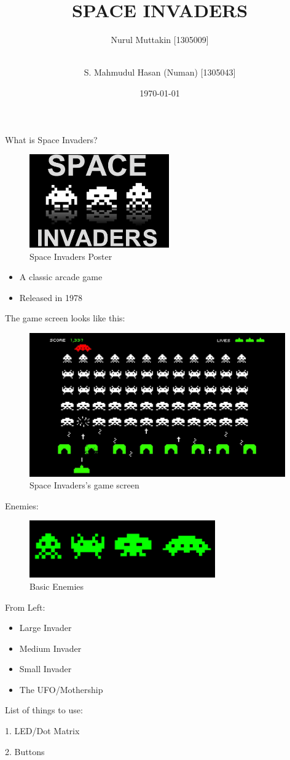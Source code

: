 \documentclass[15pt]{beamer}
\title{SPACE INVADERS}
\author[Muttakin \and Numan]{Nurul Muttakin [1305009] \and \\ S. Mahmudul Hasan (Numan) [1305043]}
\institute[BUET]{Bangladesh University of Engineering and Technology}
\date{\today}
\begin{document}
\begin{frame}
\titlepage
\end{frame}

\begin{frame}
What is Space Invaders?

	\begin{figure}[ht!]
		\centering
		\includegraphics[width=60mm]{space-invaders-2.jpg}
		\caption{Space Invaders Poster}
	\end{figure}


    \begin{itemize}
        \item A classic arcade game 
        \item Released in 1978
    \end{itemize}
\end{frame}

\begin{frame}
The game screen looks like this:
\begin{figure}[ht!]
\centering
\includegraphics[width=110mm]{space_invaders_screen.jpg}
\caption{Space Invaders's game screen}
\end{figure}
\end{frame}

\begin{frame}
Enemies:
	\begin{figure}[ht!]
	\centering
	\includegraphics[width=80mm]{basic_enemies.png}
	\caption{Basic Enemies}
	\end{figure}
From Left:
	\begin{itemize}
		\item Large Invader
		\item Medium Invader
		\item Small Invader
		\item The UFO/Mothership
	\end{itemize}
\end{frame}

\begin{frame}
List of things to use:

1. LED/Dot Matrix

2. Buttons

\end{frame}
\end{document}
